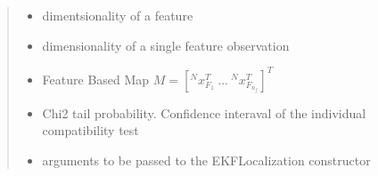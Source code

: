 \documentclass[letterpaper,10pt,english]{sphinxmanual}
\begin{document}
\begin{fulllineitems}
\begin{fulllineitems}
\begin{quote}
\begin{description}
\begin{itemize}
\item {} 
\sphinxAtStartPar
{} \textendash{} dimentsionality of a feature

\item {} 
\sphinxAtStartPar
{} \textendash{} dimensionality of a single feature observation

\item {} 
\sphinxAtStartPar
{} \textendash{} Feature Based Map \(M =[^Nx_{F_1}^T~...~^Nx_{F_{n_f}}^T]^T\)

\item {} 
\sphinxAtStartPar
{} \textendash{} Chi2 tail probability. Confidence interaval of the individual compatibility test

\item {} 
\sphinxAtStartPar
{} \textendash{} arguments to be passed to the EKFLocalization constructor

\end{itemize}

\end{description}\end{quote}

\end{fulllineitems}



\end{fulllineitems}
\end{document}

